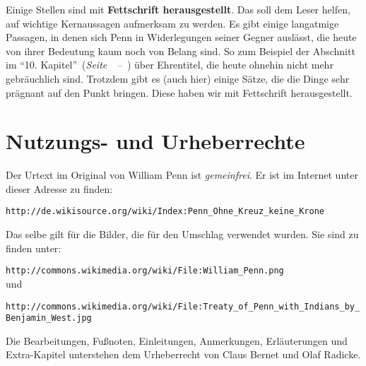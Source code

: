 Einige Stellen sind mit \textbf{Fettschrift herausgestellt}. Das soll dem Leser
helfen, auf wichtige Kernaussagen aufmerksam zu werden. Es gibt einige langatmige
Passagen, in denen sich Penn in Widerlegungen seiner Gegner auslässt, die
heute von ihrer Bedeutung kaum noch von Belang sind. So zum Beispiel der Abschnitt im
"`10. Kapitel"'~(\textit{Seite~\pageref{kap10}~--~\pageref{kap10_ende}}) über
Ehrentitel, die heute ohnehin nicht mehr gebräuchlich sind. Trotzdem gibt es
(auch hier) einige Sätze, die die Dinge sehr prägnant auf den Punkt bringen.
Diese haben wir mit Fettschrift herausgestellt.

\chapter{Nutzungs- und Urheberrechte}
Der Urtext im Original von William Penn ist \textit{gemeinfrei}. Er ist im Internet
unter dieser Adresse zu finden:

\begin{center}
\texttt{http://de.wikisource.org/wiki/Index:Penn\_Ohne\_Kreuz\_keine\_Krone}
\end{center}

Das selbe gilt für die Bilder, die für den Umschlag verwendet wurden. Sie sind zu finden unter:

\begin{center}
\texttt{http://commons.wikimedia.org/wiki/File:William\_Penn.png}\\
und\\
\begin{footnotesize}
\texttt{http://commons.wikimedia.org/wiki/File:Treaty\_of\_Penn\_with\_Indians\_by\_Benjamin\_West.jpg}\\
\end{footnotesize}
\end{center}

Die Bearbeitungen, Fußnoten, Einleitungen, Anmerkungen, Erläuterungen und
Extra-Kapitel unterstehen dem Urheberrecht von Claus Bernet und Olaf Radicke.




